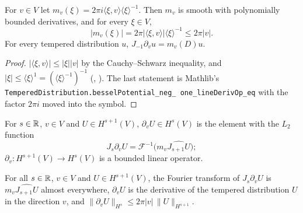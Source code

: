 \begin{lemma}
\label{lem:line-derivative-symbol}
\leanok
{}
For $v \in V$ let $m_v(\xi) = 2 \pi i \langle \xi, v \rangle \langle \xi \rangle^{-1}$. Then
$m_v$ is smooth with polynomially bounded derivatives, and for every $\xi \in V$,
\[
  |m_v(\xi)| = 2 \pi |\langle \xi, v \rangle| \langle \xi \rangle^{-1} \leq 2 \pi |v| .
\]
For every tempered distribution $u$, $J_{-1} \partial_v u = m_v(D) u$.
\end{lemma}

\begin{proof}
\leanok
$|\langle \xi, v \rangle| \leq |\xi| |v|$ by the Cauchy--Schwarz inequality, and
$|\xi| \leq \langle \xi \rangle^1 = (\langle \xi \rangle^{-1})^{-1}$
(, ). The last statement is
Mathlib's \texttt{TemperedDistribution.\allowbreak besselPotential\_\allowbreak neg\_\allowbreak
one\_\allowbreak lineDerivOp\_\allowbreak eq} with the factor $2 \pi i$ moved into the symbol.
\end{proof}

\begin{definition}
\label{def:sobolev-line-derivative}
\leanok
{}
For $s \in \mathbb{R}$, $v \in V$ and $U \in H^{s+1}(V)$, $\partial_v U \in H^s(V)$ is the element with
the $L_2$ function
\[
  J_s \partial_v U = \mathcal F^{-1} \bigl(m_v \widehat{J_{s+1} U}\bigr) ;
\]
$\partial_v : H^{s+1}(V) \to H^s(V)$ is a bounded linear operator.
\end{definition}

\begin{lemma}
\label{lem:sobolev-line-derivative}
\leanok
{}
For all $s \in \mathbb{R}$, $v \in V$ and $U \in H^{s+1}(V)$, the Fourier transform of $J_s \partial_v U$
is $m_v \widehat{J_{s+1} U}$ almost everywhere, $\partial_v U$ is the derivative of the tempered
distribution $U$ in the direction $v$, and
$\|\partial_v U\|_{H^s} \leq 2 \pi |v| \, \|U\|_{H^{s+1}}$.
\end{lemma}

